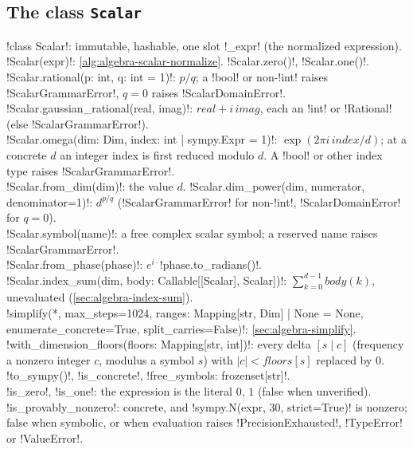 \subsection{The class \texttt{Scalar}}\label{sec:algebra-scalar-api}

\begin{signature}
\py!class Scalar!: immutable, hashable, one slot \py!_expr! (the normalized expression).\\
\py!Scalar(expr)!: \cref{alg:algebra-scalar-normalize}. \py!Scalar.zero()!, \py!Scalar.one()!.\\
\py!Scalar.rational(p: int, q: int = 1)!: $p/q$; a \py!bool! or non-\py!int! raises \py!ScalarGrammarError!, $q=0$ raises \py!ScalarDomainError!.\\
\py!Scalar.gaussian_rational(real, imag)!: $\mathit{real}+i\,\mathit{imag}$, each an \py!int! or \py!Rational! (else \py!ScalarGrammarError!).\\
\py!Scalar.omega(dim: Dim, index: int | sympy.Expr = 1)!: $\exp(2\pi i\,\mathit{index}/d)$; at a concrete $d$ an integer index is first reduced modulo $d$. A \py!bool! or other index type raises \py!ScalarGrammarError!.\\
\py!Scalar.from_dim(dim)!: the value $d$. \py!Scalar.dim_power(dim, numerator, denominator=1)!: $d^{p/q}$ (\py!ScalarGrammarError! for non-\py!int!, \py!ScalarDomainError! for $q=0$).\\
\py!Scalar.symbol(name)!: a free complex scalar symbol; a reserved name raises \py!ScalarGrammarError!.\\
\py!Scalar.from_phase(phase)!: $e^{i\cdot}$\py!phase.to_radians()!.\\
\py!Scalar.index_sum(dim, body: Callable[[Scalar], Scalar])!: $\sum_{k=0}^{d-1}\mathit{body}(k)$, unevaluated (\cref{sec:algebra-index-sum}).\\
\py!simplify(*, max_steps=1024, ranges: Mapping[str, Dim] | None = None, enumerate_concrete=True, split_carries=False)!: \cref{sec:algebra-simplify}.\\
\py!with_dimension_floors(floors: Mapping[str, int])!: every delta $[s\mid c]$ (frequency a nonzero integer $c$, modulus a symbol $s$) with $|c|<\mathit{floors}[s]$ replaced by $0$.\\
\py!to_sympy()!, \py!is_concrete!, \py!free_symbols: frozenset[str]!.\\
\py!is_zero!, \py!is_one!: the expression is the literal $0$, $1$ (false when unverified).\\
\py!is_provably_nonzero!: concrete, and \py!sympy.N(expr, 30, strict=True)! is nonzero; false when symbolic, or when evaluation raises \py!PrecisionExhausted!, \py!TypeError! or \py!ValueError!.\\

\end{signature}
